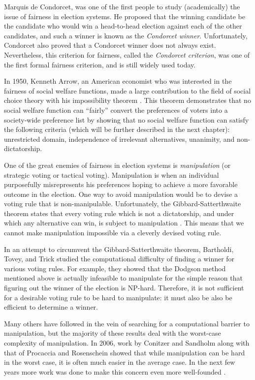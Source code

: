 	Marquis de Condorcet, was one of the first people to study (academically) the issue of fairness in election systems. He proposed that the winning candidate be the candidate who would win a head-to-head election against each of the other candidates, and such a winner is known as the \emph{Condorcet winner}. Unfortunately, Condorcet also proved that a Condorcet winner does not always exist. Nevertheless, this criterion for fairness, called the \emph{Condorcet criterion}, was one of the first formal fairness criterion, and is still widely used today.

	In 1950, Kenneth Arrow, an American economist who was interested in the fairness of social welfare functions, made a large contribution to the field of social choice theory with his impossibility theorem \cite{arrow1950difficulty, arrow1963social}. This theorem demonstrates that no social welfare function can ``fairly'' convert the preferences of voters into a society-wide preference list by showing that no social welfare function can satisfy the following criteria (which will be further described in the next chapter): unrestricted domain, independence of irrelevant alternatives, unanimity, and non-dictatorship.

	One of the great enemies of fairness in election systems is \emph{manipulation} (or strategic voting or tactical voting). Manipulation is when an individual purposefully misrepresents his preferences hoping to achieve a more favorable outcome in the election. One way to avoid manipulation would be to devise a voting rule that is non-manipulable. Unfortunately, the Gibbard-Satterthwaite theorem states that every voting rule which is not a dictatorship, and under which any alternative can win, is subject to manipulation \cite{gibbard1973manipulation, satterthwaite1975strategy, duggan2000strategic}. This means that we cannot make manipulation impossible via a cleverly devised voting rule.

	In an attempt to circumvent the Gibbard-Satterthwaite theorem, Bartholdi, Tovey, and Trick studied the computational difficulty of finding a winner for various voting rules. For example, they showed that the Dodgson method mentioned above \cite{dodgson1876method} is actually infeasible to manipulate for the simple reason that figuring out the winner of the election is NP-hard. Therefore, it is not sufficient for a desirable voting rule to be hard to manipulate: it must also be also be efficient to determine a winner.

	Many others have followed in the vein of searching for a computational barrier to manipulation, but the majority of these results deal with the worst-case complexity of manipulation. In 2006, work by Conitzer and Sandholm \cite{conitzer2006nonexistence} along with that of Procaccia and Rosenschein \cite{procaccia2006junta} showed that while manipulation can be hard in the worst case, it is often much easier in the average case. In the next few years more work was done to make this concern even more well-founded \cite{procaccia2007average, erdelyi2007approximating}.

